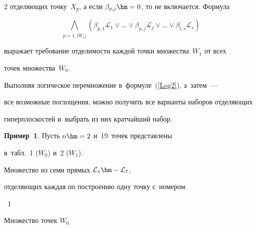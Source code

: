 \begin{multicols}{2}
отделяющих точку~$X_p$, а если $\beta_{p,j}\hm=0$, то не включается. Формула


\begin{equation}


\label{Log2}


\bigwedge\limits_{p=\overline{1,|W_1 |}} 


\left(\beta_{p,1}\mathcal{L}_1\vee \dots \vee \beta_{p,j}\mathcal{L}_j\vee 


\dots \vee \beta_{l,s}\mathcal{ L}_s \right)


\end{equation}


выражает требование отделимости каждой точки множества~$W_1$ от всех 


точек множества~$W_0$.


Выполняя логическое  перемножение  в~формуле~(\ref{Log2}), а~затем~--- 


все возможные поглощения, можно получить все варианты наборов отделяющих 


гиперплоскостей и~выбрать из них кратчайший набор.





\smallskip





\noindent


\textbf{Пример~1}. Пусть $n\hm=2$ и~19~точек представлены 


в~табл.~1 ($W_0$) и~2 ($W_1$).





Множество из семи прямых $\mathcal{L}_1\hm - \mathcal{L}_7$, 


от\-де\-ля\-ющих каждая по построению одну точку с~номером\linebreak\vspace*{-12pt}





{ \begin{center}  %


 


\noindent


{{\tablename~1}\ \ \small{


Множество точек $W_0$


}}


\end{center}}






\end{multicols}
